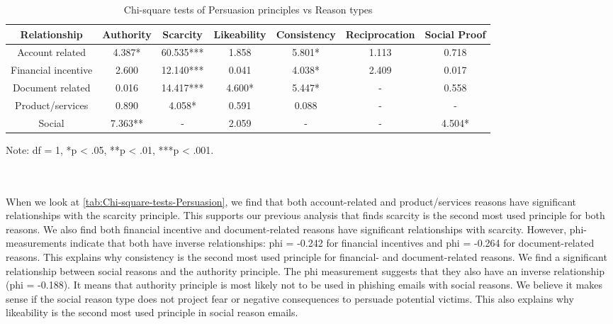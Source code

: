 \begin{minipage}[t]{1\columnwidth}%
\begin{longtable}{ccccccc}
\caption{{\scriptsize{}\label{tab:Chi-square-tests-Persuasion}Chi-square tests
of Persuasion principles vs Reason types}}
\tabularnewline
\toprule 
{\scriptsize{}Relationship} & {\scriptsize{}Authority} & {\scriptsize{}Scarcity} & {\scriptsize{}Likeability} & {\scriptsize{}Consistency} & {\scriptsize{}Reciprocation} & {\scriptsize{}Social Proof}\tabularnewline
\midrule
\midrule 
{\scriptsize{}Account related} & {\scriptsize{}4.387{*}} & {\scriptsize{}60.535{*}{*}{*}} & {\scriptsize{}1.858} & {\scriptsize{}5.801{*}} & {\scriptsize{}1.113} & {\scriptsize{}0.718}\tabularnewline
\midrule 
{\scriptsize{}Financial incentive} & {\scriptsize{}2.600} & {\scriptsize{}12.140{*}{*}{*}} & {\scriptsize{}0.041} & {\scriptsize{}4.038{*}} & {\scriptsize{}2.409} & {\scriptsize{}0.017}\tabularnewline
\midrule 
{\scriptsize{}Document related} & {\scriptsize{}0.016} & {\scriptsize{}14.417{*}{*}{*}} & {\scriptsize{}4.600{*}} & {\scriptsize{}5.447{*}} & - & {\scriptsize{}0.558}\tabularnewline
\midrule 
{\scriptsize{}Product/services} & {\scriptsize{}0.890} & {\scriptsize{}4.058{*}} & {\scriptsize{}0.591} & {\scriptsize{}0.088} & - & -\tabularnewline
\midrule 
{\scriptsize{}Social } & {\scriptsize{}7.363{*}{*}} & - & {\scriptsize{}2.059} & - & - & {\scriptsize{}4.504{*}}\tabularnewline
\midrule
\end{longtable}

Note: df = 1, {*}p < .05, {*}{*}p < .01, {*}{*}{*}p < .001.%
\end{minipage}\\
\ \\
When we look at \autoref{tab:Chi-square-tests-Persuasion}, we find
that both account-related and product/services reasons have significant
relationships with the scarcity principle. This supports our previous
analysis that finds scarcity is the second most used principle for
both reasons. We also find both financial incentive and document-related
reasons have significant relationships with scarcity. However, phi-measurements
indicate that both have inverse relationships: phi = -0.242 for financial
incentives and phi = -0.264 for document-related reasons. This explains
why consistency is the second most used principle for financial- and
document-related reasons. We find a significant relationship between
social reasons and the authority principle. The phi measurement suggests
that they also have an inverse relationship (phi = -0.188). It means
that authority principle is most likely not to be used in phishing
emails with social reasons. We believe it makes sense if the social
reason type does not project fear or negative consequences to persuade
potential victims. This also explains why likeability is the second
most used principle in social reason emails.


